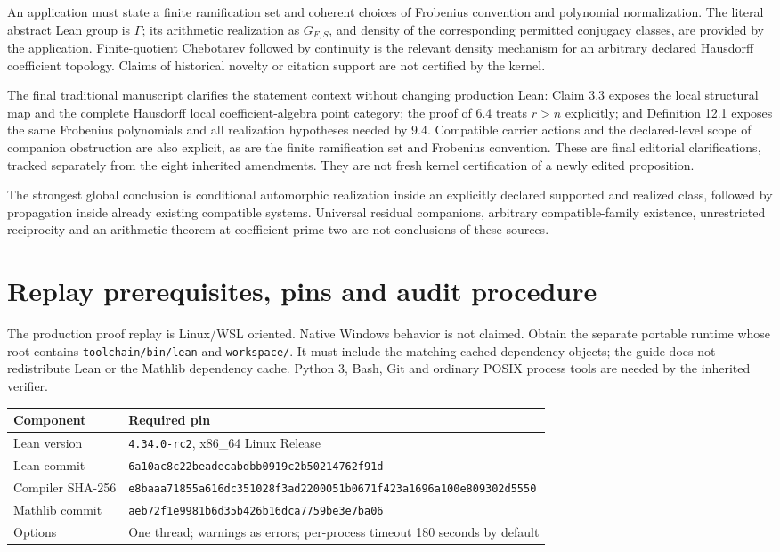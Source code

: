 \documentclass[11pt]{article}
\newcommand{\code}[1]{\nolinkurl{#1}}
\begin{document}
An application must state a finite ramification set and coherent choices of Frobenius convention and polynomial normalization. The literal abstract Lean group is \(\Gamma\); its arithmetic realization as \(G_{F,S}\), and density of the corresponding permitted conjugacy classes, are provided by the application. Finite-quotient Chebotarev followed by continuity is the relevant density mechanism for an arbitrary declared Hausdorff coefficient topology. Claims of historical novelty or citation support are not certified by the kernel.

The final traditional manuscript clarifies the statement context without changing production Lean: Claim 3.3 exposes the local structural map and the complete Hausdorff local coefficient-algebra point category; the proof of 6.4 treats \(r>n\) explicitly; and Definition 12.1 exposes the same Frobenius polynomials and all realization hypotheses needed by 9.4. Compatible carrier actions and the declared-level scope of companion obstruction are also explicit, as are the finite ramification set and Frobenius convention. These are final editorial clarifications, tracked separately from the eight inherited amendments. They are not fresh kernel certification of a newly edited proposition.

The strongest global conclusion is conditional automorphic realization inside an explicitly declared supported and realized class, followed by propagation inside already existing compatible systems. Universal residual companions, arbitrary compatible-family existence, unrestricted reciprocity and an arithmetic theorem at coefficient prime two are not conclusions of these sources.

\section{Replay prerequisites, pins and audit procedure}
The production proof replay is Linux/WSL oriented. Native Windows behavior is not claimed. Obtain the separate portable runtime whose root contains \code{toolchain/bin/lean} and \code{workspace/}. It must include the matching cached dependency objects; the guide does not redistribute Lean or the Mathlib dependency cache. Python 3, Bash, Git and ordinary POSIX process tools are needed by the inherited verifier.

\begin{tabular}{p{}p{}}
\toprule Component & Required pin\\\midrule
Lean version & \code{4.34.0-rc2}, x86\_64 Linux Release\\
Lean commit & \code{6a10ac8c22beadecabdbb0919c2b50214762f91d}\\
Compiler SHA-256 & \code{e8baaa71855a616dc351028f3ad2200051b0671f423a1696a100e809302d5550}\\
Mathlib commit & \code{aeb72f1e9981b6d35b426b16dca7759be3e7ba06}\\
Options & One thread; warnings as errors; per-process timeout 180 seconds by default\\
\bottomrule
\end{tabular}
\end{document}
